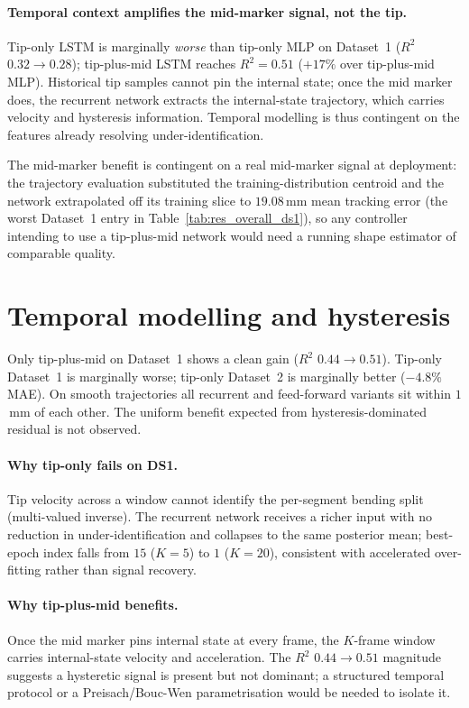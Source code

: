 \paragraph{Temporal context amplifies the mid-marker signal, not the tip.}
Tip-only LSTM is marginally \emph{worse} than tip-only MLP on Dataset~1 ($R^{2}$ $0.32 \to 0.28$); tip-plus-mid LSTM reaches $R^{2} = 0.51$ ($+17\%$ over tip-plus-mid MLP). Historical tip samples cannot pin the internal state; once the mid marker does, the recurrent network extracts the internal-state trajectory, which carries velocity and hysteresis information. Temporal modelling is thus contingent on the features already resolving under-identification.

The mid-marker benefit is contingent on a real mid-marker signal at deployment: the trajectory evaluation substituted the training-distribution centroid and the network extrapolated off its training slice to $19.08$\,mm mean tracking error (the worst Dataset~1 entry in Table~\ref{tab:res_overall_ds1}), so any controller intending to use a tip-plus-mid network would need a running shape estimator of comparable quality.

\section{Temporal modelling and hysteresis}
\label{sec:disc_temporal}

Only tip-plus-mid on Dataset~1 shows a clean gain ($R^{2}$ $0.44 \to 0.51$). Tip-only Dataset~1 is marginally worse; tip-only Dataset~2 is marginally better ($-4.8\%$ MAE). On smooth trajectories all recurrent and feed-forward variants sit within $1$\,mm of each other. The uniform benefit expected from hysteresis-dominated residual is not observed.

\paragraph{Why tip-only fails on DS1.}
Tip velocity across a window cannot identify the per-segment bending split (multi-valued inverse). The recurrent network receives a richer input with no reduction in under-identification and collapses to the same posterior mean; best-epoch index falls from $15$ ($K=5$) to $1$ ($K=20$), consistent with accelerated over-fitting rather than signal recovery.

\paragraph{Why tip-plus-mid benefits.}
Once the mid marker pins internal state at every frame, the $K$-frame window carries internal-state velocity and acceleration. The $R^{2}$ $0.44 \to 0.51$ magnitude suggests a hysteretic signal is present but not dominant; a structured temporal protocol or a Preisach/Bouc-Wen parametrisation would be needed to isolate it.

